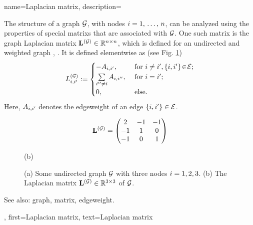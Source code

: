 {name={Laplacian matrix},
	description={The structure of a \gls{graph} $\mathcal{G}$, with 
		nodes $i=1, \,\ldots, \,n$, can be analyzed using the properties of 
		special \glspl{matrix} that are associated with $\mathcal{G}$. One such \gls{matrix} is the 
		\gls{graph} Laplacian \gls{matrix} ${\bf L}^{(\mathcal{G})} \in \mathbb{R}^{n \times n}$, 
		which is defined for an undirected and weighted \gls{graph} \cite{Luxburg2007}, \cite{Ng2001}. 
		It is defined elementwise as (see Fig. \ref{fig_lap_mtx_dict})
		\begin{equation}
			\nonumber
			L^{(\mathcal{G})}_{i,i'} := \begin{cases} - A_{i,i'}, & \mbox{ for } i\neq i', \{i,i'\}\!\in\!\mathcal{E}; \\ 
			\sum\limits_{i'' \neq i} A_{i,i''}, & \mbox{ for } i = i'; \\ 
							0, & \mbox{ else.} \end{cases}
	 	\end{equation}
  		Here, $A_{i,i'}$ denotes the \gls{edgeweight} of an edge $\{i,i'\} \in \mathcal{E}$. 
  		\begin{figure}[H]
  		\begin{center}
   		\begin{minipage}{0.45\textwidth}
	 	\end{minipage} 
	 	\hspace*{-15mm}
 		\begin{minipage}{0.45\textwidth}
	 			 \begin{equation} 
	 				 {\bf L}^{(\mathcal{G})} = \begin{pmatrix} 2 & -1& -1 \\ -1& 1 & 0 \\  -1 & 0 & 1 \end{pmatrix}  
	 				 \nonumber
	 			\end{equation} 
				\begin{minipage}{\textwidth}
				\vspace{3.5ex}
				\centering
				{\selectfont (b)}
				\end{minipage}
	 	\end{minipage}
	 	\caption{\label{fig_lap_mtx_dict} (a) Some undirected \gls{graph} $\mathcal{G}$ with three nodes $i=1,2,3$. 
	 		 (b) The Laplacian \gls{matrix} ${\bf L}^{(\mathcal{G})}  \in \mathbb{R}^{3 \times 3}$ of $\mathcal{G}$.} 
	 	\end{center}
	 	\end{figure}
		See also: \gls{graph}, \gls{matrix}, \gls{edgeweight}.},
	first={Laplacian matrix},
	text={Laplacian matrix}
}

